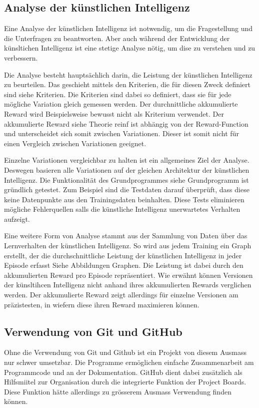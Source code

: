 \subsection{Analyse der künstlichen Intelligenz}
Eine Analyse der künstlichen Intelligenz ist notwendig, um die Fragestellung und
die Unterfragen zu beantworten. Aber auch während der Entwicklung der
künsltichen Intelligenz ist eine stetige Analyse nötig, um dise zu verstehen und
zu verbessern.

Die Analyse besteht hauptsächlich darin, die Leistung der künstlichen
Intelligenz zu beurteilen. Das geschieht mittels den Kriterien, die für diesen
Zweck definiert sind {siehe Kriterien}. Die Kriterien sind dabei so definiert,
dass sie für jede mögliche Variation gleich gemessen werden. Der durchnittliche
akkumulierte Reward wird Beispielsweise bewusst nicht als Kriterium verwendet.
Der akkumulierte Reward {siehe Theorie reinf} ist abhängig von der Reward-Function und unterscheidet
sich somit zwischen Variationen. Dieser ist somit nicht für einen Vergleich
zwischen Variationen geeignet.

Einzelne Variationen vergleichbar zu halten ist ein allgemeines Ziel der
Analyse. Deswegen basieren alle Variationen auf der gleichen Architektur der
künstlichen Intelligenz. Die Funktionalität des Grundprogrammes {siehe
Grundprogramm} ist gründlich getestet. Zum Beispiel sind die Testdaten darauf
überprüft, dass diese keine Datenpunkte aus den Trainingsdaten beinhalten. Diese
Tests eliminieren mögliche Fehlerquellen salls die künstliche Intelligenz
unerwartetes Verhalten aufzeigt.

Eine weitere Form von Analyse stammt aus der Sammlung von Daten über das
Lernverhalten der künstlichen Intelligenz. So wird aus jedem Training ein Graph
erstellt, der die durchschnittliche Leistung der künstlichen Intelligenz in
jeder Episode erfasst {Siehe Abbildungen Graphen}. Die Leistung ist dabei durch
den akkumulierten Reward pro Episode repräsentiert. Wie erwähnt können Versionen
der künsltihcen Intelligenz nicht anhand ihres akkumulierten Rewards verglichen
werden. Der akkumulierte Reward zeigt allerdings für einzelne Versionen am
präzistesten, in wiefern diese ihren Reward maximieren können.

\subsection{Verwendung von Git und GitHub}
Ohne die Verwendung von Git und Github ist ein Projekt von diesem Ausmass nur
schwer umsetzbar. Die Programme ermöglichen einfache Zusammenarbeit am
Programmcode und an der Dokumentation. GitHub dient dabei zusätzlich als
Hilfsmiitel zur Organisation durch die integrierte Funktion der Project Boards.
Diese Funktion hätte allerdings zu grösserem Ausmass Verwendung finden können.

